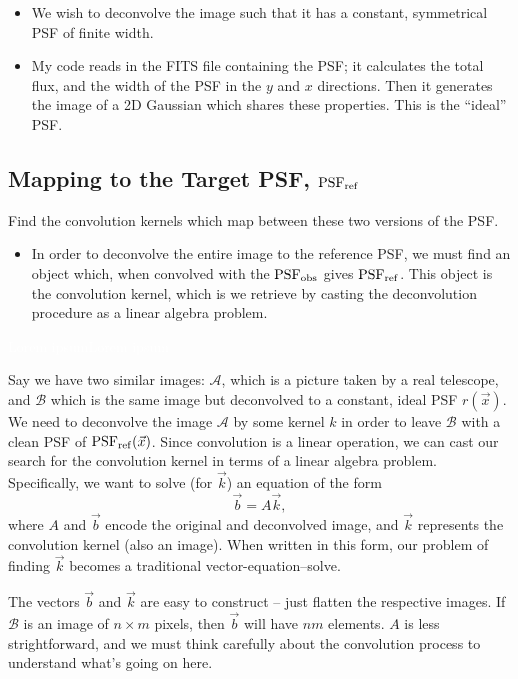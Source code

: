 \documentclass[letterpaper, 11pt]{article}
\def\psfobs{\ensuremath{{\rm PSF_{obs}}}\xspace}
\def\psfref{\ensuremath{{\rm PSF_{ref}}}\xspace}
\def\wspace{\textcolor{white}{Lorem ipsum}}
\begin{document}
\begin{itemize}
	\item We wish to deconvolve the image such that it has a constant, symmetrical PSF of finite width.
	\item My code reads in the FITS file containing the PSF; it calculates the total flux, and the width of the PSF in the $y$ and $x$ directions. Then it generates the image of a 2D Gaussian which shares these properties. This is the ``ideal'' PSF.
\end{itemize}

\subsection{Mapping to the Target PSF, \psfref}
\label{sec:kernel}


Find the convolution kernels which map between these two versions of the PSF.
\begin{itemize}
	\item In order to deconvolve the entire image to the reference PSF, we must find an object which, when convolved with the \psfobs gives \psfref. This object is the convolution kernel, which is we retrieve by casting the deconvolution procedure as a linear algebra problem.
\end{itemize}
\wspace\newline\wspace\newline

Say we have two similar images: $\mathcal{A}$, which is a picture taken by a real telescope, and $\mathcal{B}$ which is the same image but deconvolved to a constant, ideal PSF $r(\vec x)$. We need to deconvolve the image  $\mathcal{A}$ by some kernel $k$ in order to leave $\mathcal{B}$ with a clean PSF of $\psfref(\vec x)$. Since convolution is a linear operation, we can cast our search for the convolution kernel in terms of a linear algebra problem. Specifically, we want to solve (for $\vec k$) an equation of the form
\begin{equation}\label{eqn:vector}
	\vec b = A \vec k,
\end{equation}
where $A$ and $\vec b$ encode the original and deconvolved image, and $\vec k$ represents the convolution kernel (also an image). When written in this form, our problem of finding $\vec k$ becomes a traditional vector-equation--solve.

The vectors $\vec b$ and $\vec k$ are easy to construct -- just flatten the respective images. If $\mathcal B$ is an image of $n\times m$ pixels, then $\vec b$ will have $nm$ elements. $A$ is less strightforward, and we must think carefully about the convolution process to understand what's going on here.
\end{document}
